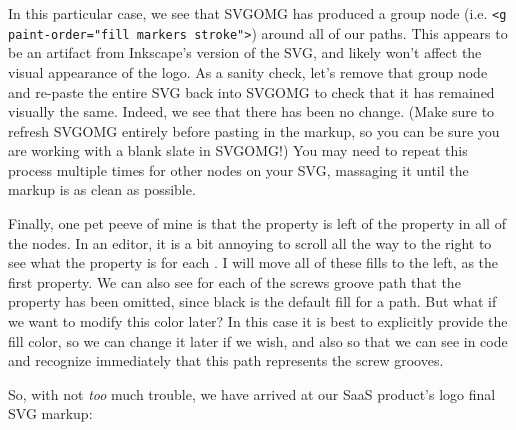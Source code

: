 \documentclass[paper=6in:9in,pagesize=pdftex,headinclude=on,footinclude=on,12pt]{scrbook}
\begin{document}
In this particular case, we see that SVGOMG has produced a group node (i.e. \texttt{<g paint-order="fill markers stroke">}) around all of our paths. This appears to be an artifact from Inkscape's version of the SVG, and likely won't affect the visual appearance of the logo. As a sanity check, let's remove that group node and re-paste the entire SVG back into SVGOMG to check that it has remained visually the same. Indeed, we see that there has been no change. (Make sure to refresh SVGOMG entirely before pasting in the markup, so you can be sure you are working with a blank slate in SVGOMG!) You may need to repeat this process multiple times for other nodes on your SVG, massaging it until the markup is as clean as possible.

Finally, one pet peeve of mine is that the  property is left of the  property in all of the nodes. In an editor, it is a bit annoying to scroll all the way to the right to see what the  property is for each . I will move all of these fills to the left, as the first property. We can also see for each of the screws groove path that the  property has been omitted, since black is the default fill for a path. But what if we want to modify this color later? In this case it is best to explicitly provide the fill color, so we can change it later if we wish, and also so that we can see in code and recognize immediately that this path represents the screw grooves.

So, with not \textit{too} much trouble, we have arrived at our SaaS product's logo final SVG markup:

\end{document}
